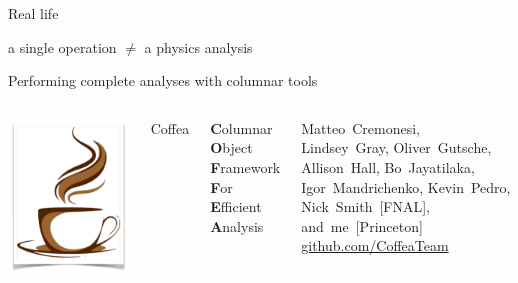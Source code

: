 \documentclass[aspectratio=169]{beamer}
\begin{document}
\begin{frame}{Real life}
\vspace{0.5 cm}
\LARGE
\begin{center}
a single operation $\ne$ a physics analysis
\end{center}
\end{frame}

\begin{frame}{Performing complete analyses with columnar tools}
\vspace{0.5 cm}
\begin{columns}
\includegraphics[width=\linewidth]{coffea-logo.png}

\hspace{-0.2 cm}\Huge Coffea

\vspace{0.25 cm}
\large {\bf C}olumnar {\bf O}bject {\bf F}ramework {\bf F}or {\bf E}fficient {\bf A}nalysis

\vspace{0.25 cm}
\normalsize Matteo~Cremonesi, Lindsey~Gray, Oliver~Gutsche, Allison~Hall, Bo~Jayatilaka, Igor~Mandrichenko, Kevin~Pedro, Nick~Smith~[FNAL], and~me~[Princeton] \hfill \textcolor{blue}{\url{github.com/CoffeaTeam}}
\end{columns}


\end{frame}
\end{document}
